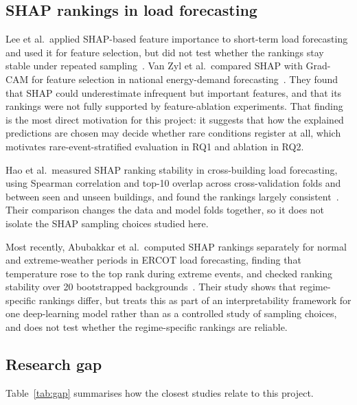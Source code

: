\documentclass[11pt,a4paper]{article}
\begin{document}
\subsection{SHAP rankings in load forecasting}

Lee et al.\ applied SHAP-based feature importance to short-term load forecasting and used it for feature selection, but did not test whether the rankings stay stable under repeated sampling~\cite{lee2023}. Van Zyl et al.\ compared SHAP with Grad-CAM for feature selection in national energy-demand forecasting~\cite{vanzyl2024}. They found that SHAP could underestimate infrequent but important features, and that its rankings were not fully supported by feature-ablation experiments. That finding is the most direct motivation for this project: it suggests that how the explained predictions are chosen may decide whether rare conditions register at all, which motivates rare-event-stratified evaluation in RQ1 and ablation in RQ2.

Hao et al.\ measured SHAP ranking stability in cross-building load forecasting, using Spearman correlation and top-10 overlap across cross-validation folds and between seen and unseen buildings, and found the rankings largely consistent~\cite{hao2026}. Their comparison changes the data and model folds together, so it does not isolate the SHAP sampling choices studied here.

Most recently, Abubakkar et al.\ computed SHAP rankings separately for normal and extreme-weather periods in ERCOT load forecasting, finding that temperature rose to the top rank during extreme events, and checked ranking stability over 20 bootstrapped backgrounds~\cite{abubakkar2026}. Their study shows that regime-specific rankings differ, but treats this as part of an interpretability framework for one deep-learning model rather than as a controlled study of sampling choices, and does not test whether the regime-specific rankings are reliable.

\subsection{Research gap}

Table~\ref{tab:gap} summarises how the closest studies relate to this project.
\end{document}
